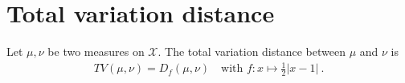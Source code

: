 \chapter{Total variation distance}

\begin{definition}[TV distance]
  \label{def:TV}
  \leanok
    Let $\mu, \nu$ be two measures on $\mathcal X$. The total variation distance between $\mu$ and $\nu$ is
  \begin{align*}
    TV(\mu, \nu) = D_f(\mu, \nu) \quad \text{with } f: x \mapsto \frac{1}{2}\vert x - 1 \vert \: .
  \end{align*}
\end{definition}